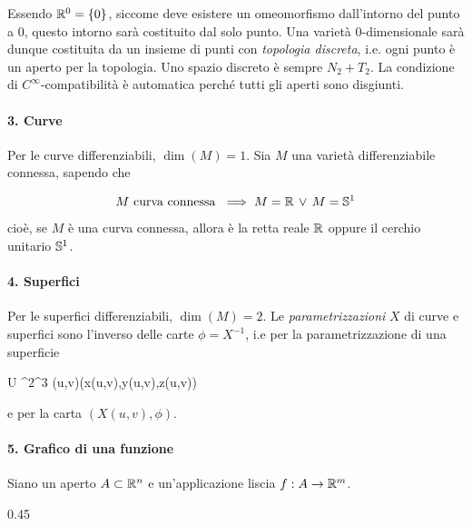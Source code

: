 Essendo $ \R^{0} = \{0\} $, siccome deve esistere un omeomorfismo dall'intorno del punto a $ 0 $, questo intorno sarà costituito dal solo punto. Una varietà 0-dimensionale sarà dunque costituita da un insieme di punti con \textit{topologia discreta}, i.e. ogni punto è un aperto per la topologia. Uno spazio discreto è sempre $ N_{2}+T_{2} $. La condizione di $ C^{\infty} $-compatibilità è automatica perché tutti gli aperti sono disgiunti.

\paragraph{3. Curve}

Per le curve differenziabili, $ \dim (M) = 1 $. Sia $ M $ una varietà differenziabile connessa, sapendo che

\begin{theorem}
	\begin{equation}
		M \text{ curva connessa } \implies M = \R \, \lor \, M = \S^{1}
	\end{equation}

	cioè, se $ M $ è una curva connessa, allora è la retta reale $ \R $ oppure il cerchio unitario $ \S^{1} $.
\end{theorem}

\paragraph{4. Superfici}

Per le superfici differenziabili, $ \dim (M) = 2 $. Le \textit{parametrizzazioni} $ X $ di curve e superfici sono l'inverso delle carte $ \phi = X^{-1} $, i.e per la parametrizzazione di una superficie

%
	{U \subset \R^{2}}{\R^{3}}%
	{(u,v)}{(x(u,v),y(u,v),z(u,v))}

e per la carta $ (X(u,v),\phi) $.

\paragraph{5. Grafico di una funzione}

Siano un aperto $ A \subset \R^{n} $ e un'applicazione liscia $ f : A \to \R^{m} $.

	{0.45}{%
		}


